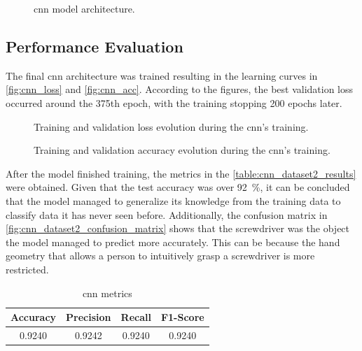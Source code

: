 \begin{figure}[ht]
    \centering
    {\fontsize{10}{12}\selectfont}
    \caption{\acs{cnn} model architecture.}
    \label{fig:cnn_architecture}
\end{figure}

\subsection{Performance Evaluation}

The final \acs{cnn} architecture was trained resulting in the learning curves in \autoref{fig:cnn_loss} and \autoref{fig:cnn_acc}. According to the figures, the best validation loss occurred around the 375th epoch, with the training stopping 200 epochs later.

\begin{figure}[ht]
    \centering
    {\fontsize{9.5}{12}\selectfont}
    \caption{Training and validation loss evolution during the \acs{cnn}'s training.}
    \label{fig:cnn_loss}
\end{figure}

\begin{figure}[ht]
    \centering
    {\fontsize{9.5}{12}\selectfont}
    \caption{Training and validation accuracy evolution during the \acs{cnn}'s training.}
    \label{fig:cnn_acc}
\end{figure}

After the model finished training, the metrics in the \autoref{table:cnn_dataset2_results} were obtained. Given that the test accuracy was over \SI{92}{\percent}, it can be concluded that the model managed to generalize its knowledge from the training data to classify data it has never seen before. Additionally, the confusion matrix in \autoref{fig:cnn_dataset2_confusion_matrix} shows that the screwdriver was the object the model managed to predict more accurately. This can be because the hand geometry that allows a person to intuitively grasp a screwdriver is more restricted.

\begin{table}[ht]
    \centering
    \caption{\acs{cnn} metrics}
    \label{table:cnn_dataset2_results}
    \begin{tabular}{cccc}
        \toprule
        Accuracy & Precision & Recall & F1-Score \\
        \midrule
        0.9240 & 0.9242 & 0.9240 & 0.9240 \\
        \bottomrule
    \end{tabular}
\end{table}

